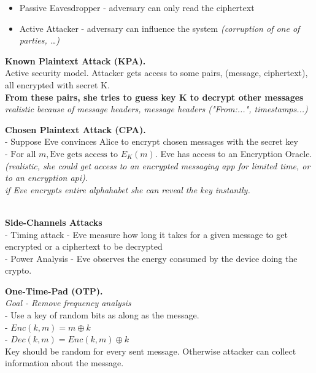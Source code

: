 \documentclass[main.tex]{subfiles}
\begin{document}
\begin{minipage}[t]{0.495\textwidth}
\begin{itemize}
		\item[-] Passive Eavesdropper - adversary can only read the ciphertext
		\item[-] Active Attacker - adversary can influence the system \textit{(corruption of one of parties, \ldots)}
	\end{itemize}
	\begin{minipage}[t]{0.4\textwidth}
		\textbf{Known Plaintext Attack (KPA).}\\Active security model. Attacker gets access to some pairs, (message, ciphertext), all encrypted with secret K.\\
		\textbf{From these pairs, she tries to guess key K to decrypt other messages}\\
		\textit{realistic because of message headers, message headers ("From:...", timestamps...)}
	\end{minipage}
	\begin{minipage}[t]{0.6\textwidth}
		\textbf{Chosen Plaintext Attack (CPA).}\\
		- Suppose Eve convinces Alice to encrypt chosen messages with the secret key\\
		- $\text{For all } m, \text{Eve gets access to } E_{K}(m)$. Eve has access to an Encryption Oracle.\\
		\textit{(realistic, she could get access to an encrypted messaging app for limited time, or to an encryption api). \\
			\warning if Eve encrypts entire alphahabet she can reveal the key instantly.}
	\end{minipage}\\
	\textbf{Side-Channels Attacks}\\
	- Timing attack - Eve measure how long it takes for a given message to get encrypted or a ciphertext to be decrypted\\
	- Power Analysis - Eve observes the energy consumed by the device doing the crypto.
	\hline\\
	\begin{minipage}[t]{0.45\textwidth}
		\textbf{One-Time-Pad (OTP).}\\
		\textit{Goal - Remove frequency analysis}\\
		- Use a key of random bits as along as the message.\\
		- $Enc(k, m) = m \oplus k$\\
		- $Dec(k, m) = Enc(k, m) \oplus k$\\
		Key should be random for every sent message.
		Otherwise attacker can collect information about the message.

\end{minipage}
\end{minipage}
\end{document}
